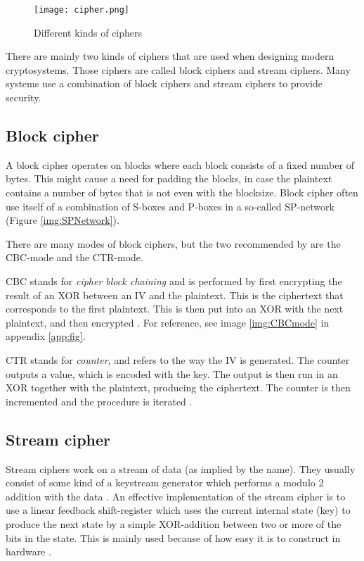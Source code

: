 \begin{figure}
  \texttt{[image: cipher.png]}
  \caption{Different kinds of ciphers \citep{CipherTax:2013}}
  \label{img:ciphers}
\end{figure}

There are mainly two kinds of ciphers that are used when designing modern 
cryptosystems. Those ciphers are called block ciphers and stream ciphers. 
Many systems use a combination of block ciphers and stream ciphers to provide 
security. 

\subsection{Block cipher}\label{sec:BlockCipher}
A block cipher operates on blocks where each block consists of a fixed number 
of bytes. This might cause a need for padding the blocks, in case the plaintext 
contains a number of bytes that is not even with the blocksize. Block cipher 
often use itself of a combination of S-boxes and P-boxes in a so-called 
SP-network (Figure \ref{img:SPNetwork}).

There are many modes of block ciphers, but the two recommended by 
\citet{Schneier:2003} are the CBC-mode and the CTR-mode.

CBC stands for \emph{cipher block chaining} and is performed by first encrypting 
the result of an XOR between an IV and the plaintext. This is the ciphertext 
that corresponds to the first plaintext. This is then put into an XOR with the 
next plaintext, and then encrypted \citep[pp. 109--111]{Stinson:2006}. For 
reference, see image \ref{img:CBCmode} in appendix \ref{app:fig}.

CTR stands for \emph{counter}, and refers to the way the IV is generated. The
counter outputs a value, which is encoded with the key. The output is then run 
in an XOR together with the plaintext, producing the ciphertext. The counter is 
then incremented and the procedure is iterated \citep[p. 111]{Stinson:2006}.

\subsection{Stream cipher} \label{sec:StreamCipher}
Stream ciphers work on a stream of data (as implied by the name). They usually 
consist of some kind of a keystream generator which performs a modulo 2 addition
with the data \cite[pp. 67]{Simmons:1992}. An effective implementation of the 
stream cipher is to use a linear feedback shift-register which uses the current 
internal state (key) to produce the next state by a simple XOR-addition between 
two or more of the bits in the state. This is mainly used because of how easy
it is to construct in hardware \citep{LFSR:2008}.

